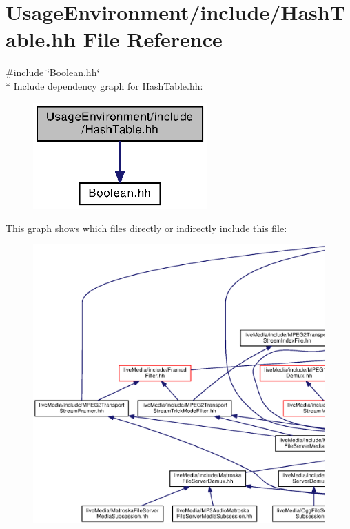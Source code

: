 \section{Usage\+Environment/include/\+Hash\+Table.hh File Reference}
\label{HashTable_8hh}
{\ttfamily \#include \char`\"{}Boolean.\+hh\char`\"{}}\\*
Include dependency graph for Hash\+Table.\+hh\+:
\nopagebreak
\begin{figure}[H]
\begin{center}
\leavevmode
\includegraphics[width=189pt]{HashTable_8hh__incl}
\end{center}
\end{figure}
This graph shows which files directly or indirectly include this file\+:
\nopagebreak
\begin{figure}[H]
\begin{center}
\leavevmode
\includegraphics[width=350pt]{HashTable_8hh__dep__incl}
\end{center}
\end{figure}
